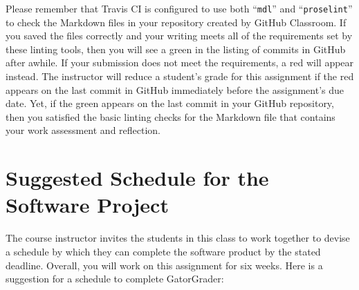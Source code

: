 \documentclass[11pt]{article}
\newcommand{\command}[1]{``\lstinline{#1}''}
\newcommand{\checkmark}{\ding{51}}
\newcommand{\naughtmark}{\ding{55}}
\begin{document}
Please remember that Travis CI is configured to use both \command{mdl} and
\command{proselint} to check the Markdown files in your repository created by
GitHub Classroom.
%
If you saved the files correctly and your writing meets all of the requirements
set by these linting tools, then you will see a green \checkmark{} in the
listing of commits in GitHub after awhile. If your submission does not meet the
requirements, a red \naughtmark{} will appear instead. The instructor will
reduce a student's grade for this assignment if the red \naughtmark{} appears on
the last commit in GitHub immediately before the assignment's due date. Yet, if
the green \checkmark{} appears on the last commit in your GitHub repository,
then you satisfied the basic linting checks for the Markdown file that contains
your work assessment and reflection.

\section*{Suggested Schedule for the Software Project}

The course instructor invites the students in this class to work together to
devise a schedule by which they can complete the software product by the stated
deadline. Overall, you will work on this assignment for six weeks. Here is a
suggestion for a schedule to complete GatorGrader:
\end{document}

